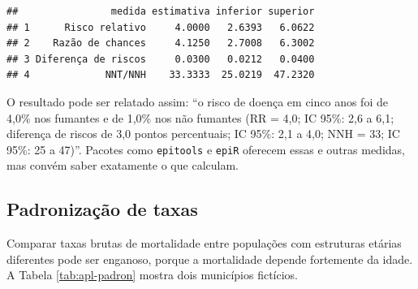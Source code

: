 \documentclass[
]{book}
\begin{document}
\begin{verbatim}
##                medida estimativa inferior superior
## 1      Risco relativo     4.0000   2.6393   6.0622
## 2    Razão de chances     4.1250   2.7008   6.3002
## 3 Diferença de riscos     0.0300   0.0212   0.0400
## 4             NNT/NNH    33.3333  25.0219  47.2320
\end{verbatim}

O resultado pode ser relatado assim: ``o risco de doença em cinco anos foi de 4,0\% nos fumantes e de 1,0\% nos não fumantes (RR = 4,0; IC 95\%: 2,6 a 6,1; diferença de riscos de 3,0 pontos percentuais; IC 95\%: 2,1 a 4,0; NNH = 33; IC 95\%: 25 a 47)''. Pacotes como \texttt{epitools} e \texttt{epiR} oferecem essas e outras medidas, mas convém saber exatamente o que calculam.

\subsection{Padronização de taxas}\label{padronizauxe7uxe3o-de-taxas}

Comparar taxas brutas de mortalidade entre populações com estruturas etárias diferentes pode ser enganoso, porque a mortalidade depende fortemente da idade. A Tabela \ref{tab:apl-padron} mostra dois municípios fictícios.

\begin{table}

\caption{\label{tab:apl-padron}Óbitos, população e taxas de mortalidade por 1.000 habitantes em dois municípios fictícios, por faixa etária.}
\centering
{}
\end{table}
\end{document}
